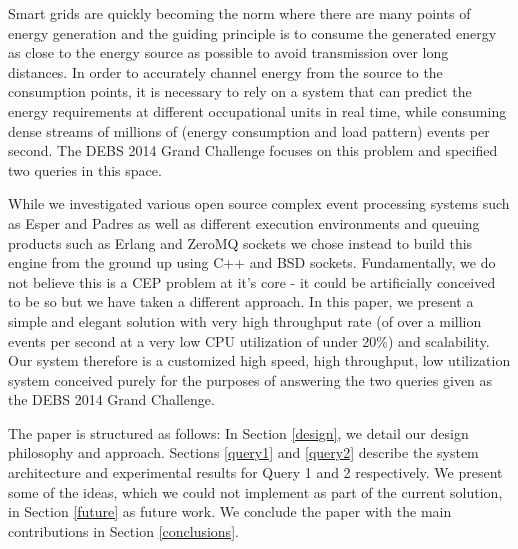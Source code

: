 Smart grids are quickly becoming the norm where there are many points of energy generation and the guiding principle is to consume the generated energy as close to the energy source as possible to avoid transmission over long distances.
In order to accurately channel energy from the source to the consumption points, it is necessary to rely on a system that can predict the energy requirements at different occupational units in real time, while consuming dense streams of millions of (energy consumption and load pattern) events per second.
The DEBS 2014 Grand Challenge\cite{ziekow2014challenge} focuses on this problem and specified two queries in this space.


While we investigated various open source complex event processing systems such as Esper\cite{Esper} and Padres\cite{Padres} as well as different execution environments and queuing products such as Erlang\cite{erlang} and ZeroMQ sockets \cite{zeromq} we chose instead to build this engine from the ground up using C++ and BSD sockets.
Fundamentally, we do not believe this is a CEP problem at it's core - it could be artificially conceived to be so but we have taken a different approach.
In this paper, we present a simple and elegant solution with very high throughput rate (of over a million events per second at a very low CPU utilization of under 20\%) and scalability.
Our system therefore is a customized high speed, high throughput, low utilization system conceived purely for the purposes of answering the two queries given as the DEBS 2014 Grand Challenge.


The paper is structured as follows: In Section \ref{design}, we detail our design philosophy and approach.
Sections \ref{query1} and \ref{query2} describe the system architecture and experimental results for Query 1 and 2 respectively.
We present some of the ideas, which we could not implement as part of the current solution, in Section \ref{future} as future work.
We conclude the paper with the main contributions in Section \ref{conclusions}.
